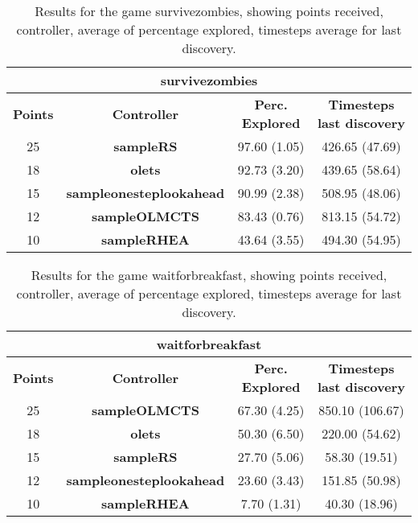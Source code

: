 \begin{table*}[!t]
\begin{center}
\begin{tabular}{|c|c|c|c|}
\multicolumn{4}{c}{\textbf{survivezombies}}\\
\hline
\textbf{Points} & \textbf{Controller} & \textbf{Perc. Explored} &  \textbf{Timesteps last discovery}\\
\hline
25 & \textbf{sampleRS} & 97.60 (1.05) & 426.65 (47.69)
 \\
\hline
18 & \textbf{olets} & 92.73 (3.20) & 439.65 (58.64)
 \\
\hline
15 & \textbf{sampleonesteplookahead} & 90.99 (2.38) & 508.95 (48.06)
 \\
\hline
12 & \textbf{sampleOLMCTS} & 83.43 (0.76) & 813.15 (54.72)
 \\
\hline
10 & \textbf{sampleRHEA} & 43.64 (3.55) & 494.30 (54.95)
 \\
\hline
\end{tabular}
\caption{Results for the game survivezombies, showing points received, controller, average of percentage explored, timesteps average for last discovery.}
\label{tab:weights}
\end{center}
\end{table*}
\begin{table*}[!t]
\begin{center}
\begin{tabular}{|c|c|c|c|}
\multicolumn{4}{c}{\textbf{waitforbreakfast}}\\
\hline
\textbf{Points} & \textbf{Controller} & \textbf{Perc. Explored} &  \textbf{Timesteps last discovery}\\
\hline
25 & \textbf{sampleOLMCTS} & 67.30 (4.25) & 850.10 (106.67)
 \\
\hline
18 & \textbf{olets} & 50.30 (6.50) & 220.00 (54.62)
 \\
\hline
15 & \textbf{sampleRS} & 27.70 (5.06) & 58.30 (19.51)
 \\
\hline
12 & \textbf{sampleonesteplookahead} & 23.60 (3.43) & 151.85 (50.98)
 \\
\hline
10 & \textbf{sampleRHEA} & 7.70 (1.31) & 40.30 (18.96)
 \\
\hline
\end{tabular}
\caption{Results for the game waitforbreakfast, showing points received, controller, average of percentage explored, timesteps average for last discovery.}
\label{tab:weights}
\end{center}
\end{table*}
